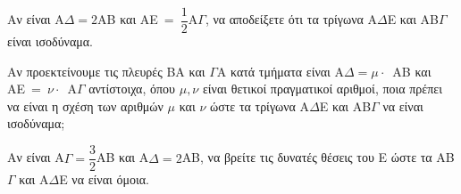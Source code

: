 \begin{alist}
    \item Αν είναι \mbox{A$\Delta = 2$AB} και \mbox{AE = $\dfrac{1}{2}$A$\Gamma$}, να αποδείξετε ότι τα τρίγωνα \mbox{A$\Delta$E} και \mbox{AB$\Gamma$} είναι ισοδύναμα. 
    \item Αν προεκτείνουμε τις πλευρές \mbox{BA} και \mbox{$\Gamma$A} κατά τμήματα είναι \mbox{A$\Delta = \mu \cdot$ AB} και \mbox{AE = $\nu \cdot$ A$\Gamma$} αντίστοιχα, όπου \mbox{$\mu, \nu$} είναι θετικοί πραγματικοί αριθμοί, ποια πρέπει να είναι η σχέση των αριθμών \mbox{$\mu$} και \mbox{$\nu$} ώστε τα τρίγωνα \mbox{A$\Delta$E} και \mbox{AB$\Gamma$} να είναι ισοδύναμα; 
    \item Αν είναι \mbox{A$\Gamma = \dfrac{3}{2}$AB} και \mbox{A$\Delta = 2$AB}, να βρείτε τις δυνατές θέσεις του \mbox{E} ώστε τα \mbox{AB$\Gamma$} και \mbox{A$\Delta$E} να είναι όμοια. 
\end{alist}